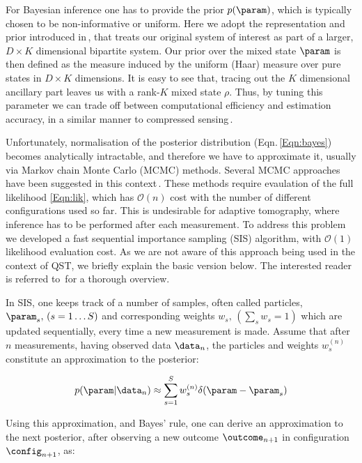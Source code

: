 For Bayesian inference one has to provide the prior $p(\param)$, which is typically chosen to be non-informative or uniform. Here we adopt the representation and prior introduced in\,\citep{BayesianTomography}, that treats our original system of interest as part of a larger, $D\times K$ dimensional bipartite system. Our prior over the mixed state $\param$ is then defined as the measure induced by the uniform (Haar) measure over pure states in $D\times K$ dimensions. It is easy to see that, tracing out the $K$ dimensional ancillary part leaves us with a rank-$K$ mixed state $\rho$. Thus, by tuning this parameter we can trade off between computational efficiency and estimation accuracy, in a similar manner to compressed sensing\,\citep{CompressedSensing}.

Unfortunately, normalisation of the posterior distribution (Eqn.\,\eqref{Eqn:bayes}) becomes analytically intractable, and therefore we have to approximate it, usually via Markov chain Monte Carlo (MCMC) methods. Several MCMC approaches have been suggested in this context\,\cite[][and refs.\ therein]{BayesianTomography}. These methods require evaulation of the full likelihood \eqref{Eqn:lik}, which has $\mathcal{O}(n)$ cost with the number of different configurations used so far. This is undesirable for adaptive tomography, where inference has to be performed after each measurement. To address this problem we developed a fast sequential importance sampling (SIS) algorithm, with $\mathcal{O}(1)$ likelihood evaluation cost. As we are not aware of this approach being used in the context of QST, we briefly explain the basic version below. The interested reader is referred to\,\citep{SMCBook} for a thorough overview.

In SIS, one keeps track of a number of samples, often called particles, $\param_s,\, (s=1\ldots S)$ and corresponding weights $w_s, \, \left( \sum_s w_s = 1 \right)$  which are updated sequentially, every time a new measurement is made. Assume that after $n$ measurements, having observed data $\data_n$, the particles and weights  $w^{(n)}_s$ constitute an approximation to the posterior:

\begin{equation}
	p(\param\vert\data_n)\approx \sum_{s=1}^{S}w^{(n)}_s\delta(\param-\param_s)\label{Eqn:SISapprox}
\end{equation}

Using this approximation, and Bayes' rule, one can derive an approximation to the next posterior, after observing a new outcome $\outcome_{n+1}$ in configuration $\config_{n+1}$, as:

